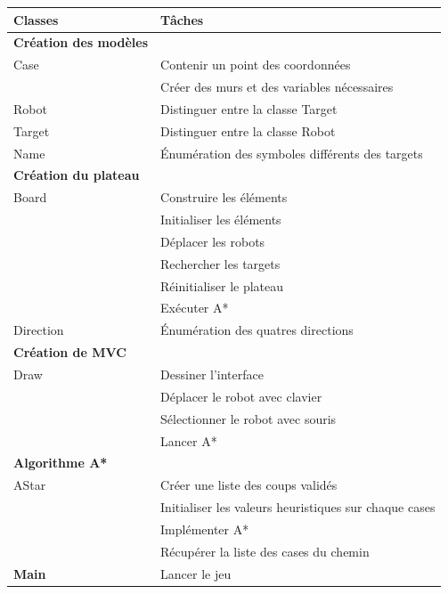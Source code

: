 \documentclass[12pt, pdflatex]{article}
\begin{document}
    \begin{center}
        \begin{tabular}{|p{5cm}|p{9cm}|}\hline
            \textbf{Classes}& \textbf{Tâches}\\ \hline\hline
            \textbf{Création des modèles}& \\ \hline
            Case&  Contenir un point des coordonnées\\ &Créer des murs et des variables nécessaires     \\ \hline
            Robot&  Distinguer entre la classe Target    \\ \hline
            Target&  Distinguer entre la classe Robot   \\ \hline
            Name& Énumération des symboles différents des targets \\\hline

            \textbf{Création du plateau}& \\\hline
            Board& Construire les éléments \\ &Initialiser les éléments\\ &Déplacer les robots \\ &Rechercher les targets\\ &Réinitialiser le plateau \\ &Exécuter A* \\ \hline
            Direction& Énumération des quatres directions \\\hline

            \textbf{Création de MVC}& \\\hline 
            Draw&  Dessiner l'interface \\ &Déplacer le robot avec clavier \\ &Sélectionner le robot avec souris \\ &Lancer A*      \\ \hline
            
            \textbf{Algorithme A*}& \\\hline
            AStar& Créer une liste des coups validés\\ &Initialiser les valeurs heuristiques sur chaque cases \\ &Implémenter A* \\ &Récupérer la liste des cases du chemin \\\hline

            \textbf{Main}& Lancer le jeu\\\hline
            

        \end{tabular}
    \end{center}
\end{document}
